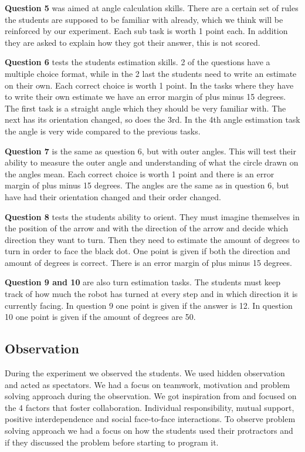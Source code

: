 \bigskip\noindent
\textbf{Question 5} was aimed at angle calculation skills. There are a certain set of rules the students are supposed to be familiar with already, which we think will be reinforced by our experiment. Each sub task is worth 1 point each. In addition they are asked to explain how they got their answer, this is not scored.

\bigskip\noindent
\textbf{Question 6} tests the students estimation skills. 2 of the questions have a multiple choice format, while in the 2 last the students need to write an estimate on their own. Each correct choice is worth 1 point. In the tasks where they have to write their own estimate we have an error margin of plus minus 15 degrees. The first task is a straight angle which they should be very familiar with. The next has its orientation changed, so does the 3rd. In the 4th angle estimation task the angle is very wide compared to the previous tasks. 

\bigskip\noindent
\textbf{Question 7} is the same as question 6, but with outer angles. This will test their ability to measure the outer angle and understanding of what the circle drawn on the angles mean. Each correct choice is worth 1 point and there is an error margin of plus minus 15 degrees. The angles are the same as in question 6, but have had their orientation changed and their order changed. 

\bigskip\noindent
\textbf{Question 8} tests the students ability to orient. They must imagine themselves in the position of the arrow and with the direction of the arrow and decide which direction they want to turn. Then they need to estimate the amount of degrees to turn in order to face the black dot. One point is given if both the direction and amount of degrees is correct. There is an error margin of plus minus 15 degrees. 

\bigskip\noindent
\textbf{Question 9 and 10} are also turn estimation tasks. The students must keep track of how much the robot has turned at every step and in which direction it is currently facing. In question 9 one point is given if the answer is 12. In question 10 one point is given if the amount of degrees are 50. 

\subsection*{Observation}
During the experiment we observed the students. We used hidden observation and acted as spectators. We had a focus on teamwork, motivation and problem solving approach during the observation. We got inspiration from  and focused on the 4 factors that foster collaboration. Individual responsibility, mutual support, positive interdependence and social face-to-face interactions. To observe problem solving approach we had a focus on how the students used their protractors and if they discussed the problem before starting to program it.

